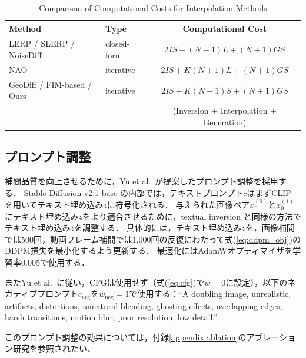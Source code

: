 \documentclass[MIRU,submit]{miru2026j}
\theoremstyle{definition}
\newcommand{\sss}[1]{{\scriptscriptstyle (#1)}}
\begin{document}
\begin{table}[t]
    \centering
    \scriptsize
    \caption{Comparison of Computational Costs for Interpolation Methods}
    \label{tab:comp_cost}
    \begin{tabular}{@{}llc@{}}
        \toprule
        \textbf{Method}                                             & \textbf{Type} & \textbf{Computational Cost}              \\
        \midrule
        LERP / SLERP / NoiseDiff \cite{Zheng2024}                   & closed-form   & $2IS + (N-1) L + (N+1)GS$                \\
        NAO \cite{Samuel2023}                                       & iterative     & $2IS + K (N+1) L + (N+1)GS$              \\
        GeoDiff \cite{Yu2025} / FIM-based \cite{Azeglio2025} / Ours & iterative     & $2IS + K (N-1) S + (N+1)GS$              \\
        \bottomrule
                                                                    &               & (Inversion + Interpolation + Generation) \\
    \end{tabular}
\end{table}

\subsection{プロンプト調整}\label{appendix:prompt_adjustment}
補間品質を向上させるために，Yu et al.~\cite{Yu2025}が提案したプロンプト調整を採用する．
Stable Diffusion v2.1-base \cite{Rombach2022}の内部では，テキストプロンプト$c$はまずCLIP \cite{Radford2021}を用いてテキスト埋め込み$z$に符号化される．
与えられた画像ペア$x_0^\sss{0}$と$x_0^\sss{1}$にテキスト埋め込み$z$をより適合させるために，textual inversion \cite{Gal2023}と同様の方法でテキスト埋め込み$z$を調整する．
具体的には，テキスト埋め込み$z$を，画像補間では500回，動画フレーム補間では1{,}000回の反復にわたって式(\ref{eq:ddpm_obj})のDDPM損失を最小化するよう更新する．
最適化にはAdamWオプティマイザ\cite{Loshchilov2019}を学習率0.005で使用する．

またYu et al.~\cite{Yu2025}に従い，CFGは使用せず（式(\ref{eq:cfg})で$w=0$に設定），以下のネガティブプロンプト$c_\text{neg}$を$w_\text{neg}=1$で使用する：``A doubling image, unrealistic, artifacts, distortions, unnatural blending, ghosting effects, overlapping edges, harsh transitions, motion blur, poor resolution, low detail.''

このプロンプト調整の効果については，付録\ref{appendix:ablation}のアブレーション研究を参照されたい．
\end{document}
